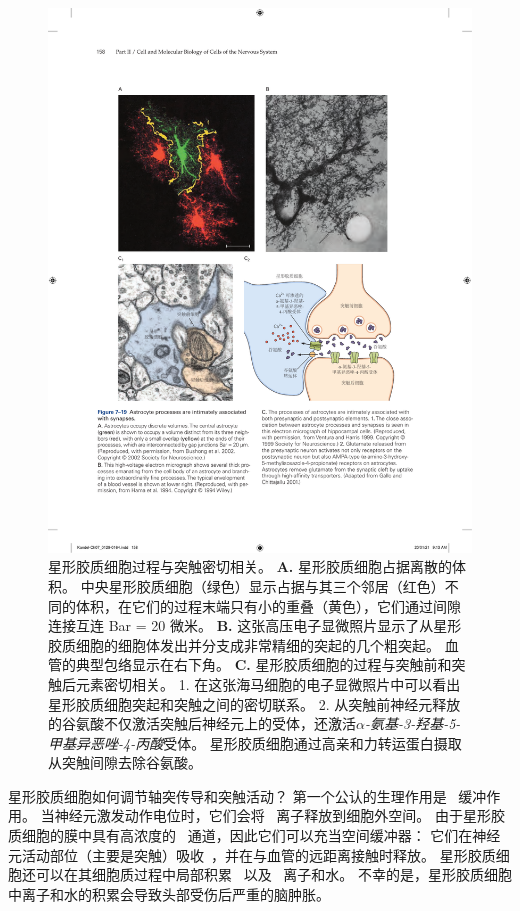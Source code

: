 \begin{figure}[htbp]
	\centering
	\includegraphics[width=1.0\linewidth]{chap07/fig_7_19}
	\caption{星形胶质细胞过程与突触密切相关。
		\textbf{A.} 星形胶质细胞占据离散的体积。
		中央星形胶质细胞（绿色）显示占据与其三个邻居（红色）不同的体积，在它们的过程末端只有小的重叠（黄色），它们通过间隙连接互连 Bar = 20 微米\cite{bushong2002protoplasmic}。
		\textbf{B.} 这张高压电子显微照片显示了从星形胶质细胞的细胞体发出并分支成非常精细的突起的几个粗突起。
		血管的典型包络显示在右下角\cite{hama1994three}。
		\textbf{C.} 星形胶质细胞的过程与突触前和突触后元素密切相关。
		1. 在这张海马细胞的电子显微照片中可以看出星形胶质细胞突起和突触之间的密切联系\cite{ventura1999three}。
		2. 从突触前神经元释放的谷氨酸不仅激活突触后神经元上的受体，还激活\textit{$\alpha$-氨基-3-羟基-5-甲基异恶唑-4-丙酸}受体。
		星形胶质细胞通过高亲和力转运蛋白摄取从突触间隙去除谷氨酸\cite{gallo2001unwrapping}。}
	\label{fig:7_19}
\end{figure}


星形胶质细胞如何调节轴突传导和突触活动？
第一个公认的生理作用是~ 缓冲作用。
当神经元激发动作电位时，它们会将~ 离子释放到细胞外空间。
由于星形胶质细胞的膜中具有高浓度的~ 通道，因此它们可以充当空间缓冲器：
它们在神经元活动部位（主要是突触）吸收~，并在与血管的远距离接触时释放。
星形胶质细胞还可以在其细胞质过程中局部积累~ 以及~ 离子和水。
不幸的是，星形胶质细胞中离子和水的积累会导致头部受伤后严重的脑肿胀。


